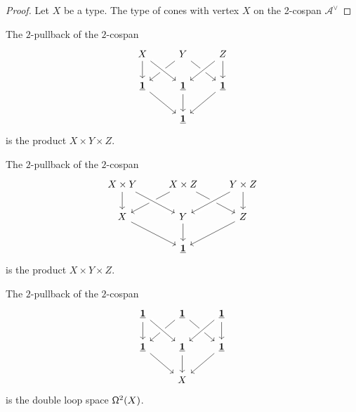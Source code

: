 \begin{proof}
Let $X$ be a type. The type of cones with vertex $X$ on the 2-cospan $\mathcal{A}^{\vee}$
\end{proof}

\begin{cor}
The $2$-pullback of the $2$-cospan
\begin{equation*}
\begin{tikzcd}
X \arrow[d] & Y \arrow[dl] \arrow[dr] & Z \arrow[d] \\
\unit \arrow[dr] & \unit \arrow[d] \arrow[from=ul,crossing over] \arrow[from=ur,crossing over] & \unit \arrow[dl] \\
& \unit
\end{tikzcd}
\end{equation*}
is the product $X\times Y\times Z$. 
\end{cor}

\begin{cor}
The $2$-pullback of the $2$-cospan
\begin{equation*}
\begin{tikzcd}
X\times Y \arrow[d] & X\times Z \arrow[dl] \arrow[dr] & Y\times Z \arrow[d] \\
X \arrow[dr] & Y \arrow[d] \arrow[from=ul,crossing over] \arrow[from=ur,crossing over] & Z \arrow[dl] \\
& \unit
\end{tikzcd}
\end{equation*}
is the product $X\times Y\times Z$. 
\end{cor}

\begin{cor}
The $2$-pullback of the $2$-cospan
\begin{equation*}
\begin{tikzcd}
\unit \arrow[d] & \unit \arrow[dl] \arrow[dr] & \unit \arrow[d] \\
\unit \arrow[dr] & \unit \arrow[d] \arrow[from=ul,crossing over] \arrow[from=ur,crossing over] & \unit \arrow[dl] \\
& X
\end{tikzcd}
\end{equation*}
is the double loop space $\loopspace[2]{X}$. 
\end{cor}

